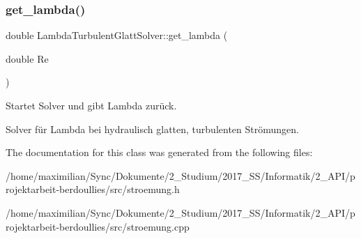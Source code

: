 \subsubsection{\texorpdfstring{get\+\_\+lambda()}{get\_lambda()}}
{\footnotesize\ttfamily double Lambda\+Turbulent\+Glatt\+Solver\+::get\+\_\+lambda (\begin{DoxyParamCaption}\item[{double}]{Re }\end{DoxyParamCaption})}



Startet Solver und gibt Lambda zurück. 

Solver für Lambda bei hydraulisch glatten, turbulenten Strömungen. 

The documentation for this class was generated from the following files\+:\begin{DoxyCompactItemize}
\item 
/home/maximilian/\+Sync/\+Dokumente/2\+\_\+\+Studium/2017\+\_\+\+S\+S/\+Informatik/2\+\_\+\+A\+P\+I/projektarbeit-\/berdoullies/src/stroemung.\+h\item 
/home/maximilian/\+Sync/\+Dokumente/2\+\_\+\+Studium/2017\+\_\+\+S\+S/\+Informatik/2\+\_\+\+A\+P\+I/projektarbeit-\/berdoullies/src/stroemung.\+cpp\end{DoxyCompactItemize}

